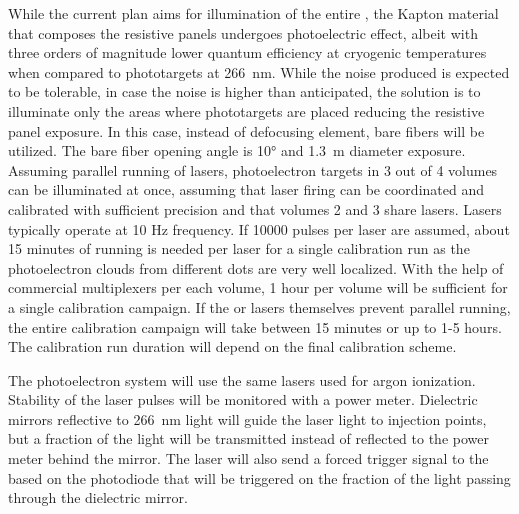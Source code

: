 
While the current plan aims for illumination of the entire , the Kapton material that composes the resistive panels undergoes photoelectric effect, albeit with three orders of magnitude lower quantum efficiency at cryogenic temperatures when compared to phototargets at \SI{266}{\nano\m}. While the noise produced is expected to be tolerable, in case the noise is higher than anticipated, the solution is to illuminate only the areas where phototargets are placed reducing the resistive panel exposure. In this case, instead of defocusing element, bare fibers will be utilized. The bare fiber opening angle is \ang{10} and \SI{1.3}{\m} diameter exposure.   
Assuming parallel running of lasers, photoelectron targets in 3 out of 4 volumes can be illuminated at once, assuming that laser firing can be coordinated and calibrated with sufficient precision and that volumes 2 and 3 share lasers. Lasers typically operate at 10 Hz frequency. If 10000 pulses per laser are assumed, about 15 minutes of running is needed per laser for a single calibration run
as the photoelectron clouds from different dots are very well localized.
With the help of commercial multiplexers per each volume, 1 hour per volume will be sufficient for a single calibration campaign. If the  or lasers themselves prevent parallel running, the entire calibration campaign will take between 15 minutes or up to 1-5 hours. The calibration run duration will depend on the final calibration scheme.

The photoelectron system will use the same lasers used for argon ionization. Stability of the laser pulses will be monitored  with  a power meter. Dielectric mirrors reflective to \SI{266}{\nano\m} light will guide the laser light to injection points, but a fraction of the light will be transmitted instead of reflected to the power meter behind the mirror. The laser will also send a forced trigger signal to the  based on the photodiode that will be triggered on the fraction of the light passing through the dielectric mirror. 

